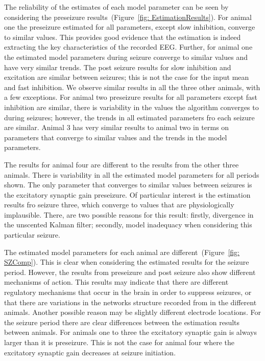 The reliability of the estimates of each model parameter can be seen by considering the preseizure results~(Figure~\ref{fig: EstimationResults}). For animal one the preseizure estimated for all parameters, except slow inhibition, converge to similar values. This provides good evidence that the estimation is indeed extracting the key characteristics of the recorded EEG. Further, for animal one the estimated model parameters during seizure converge to similar values and have very similar trends. The post seizure results for slow inhibition and excitation are similar between seizures; this is not the case for the input mean and fast inhibition. We observe similar results in all the three other animals, with a few exceptions. For animal two preseizure results for all parameters except fast inhibition are similar, there is variability in the values the algorithm converges to during seizures; however, the trends in all estimated parameters fro each seizure are similar. Animal 3 has very similar results to animal two in terms on parameters that converge to similar values and the trends in the model parameters. 

The results for animal four are different to the results from the other three animals. There is variability in all the estimated model parameters for all periods shown. The only parameter that converges to similar values between seizures is the excitatory synaptic gain preseizure. Of particular interest is the estimation results fro seizure three, which converge to values that are physiologically implausible. There, are two possible reasons for this result: firstly, divergence in the unscented Kalman filter; secondly, model inadequacy when considering this particular seizure. 

The estimated model parameters for each animal are different~(Figure~\ref{fig: SZComp}). This is clear when considering the estimated results for the seizure period. However, the results from preseizure and post seizure also show different mechanisms of action. This results may indicate that there are different regulatory mechanisms that occur in the brain in order to suppress seizures, or that there are variations in the networks structure recorded from in the different animals. Another possible reason may be slightly different electrode locations. For the seizure period there are clear differences between the estimation results between animals. For animals one to three the excitatory synaptic gain is always larger than it is preseizure. This is not the case for animal four where the excitatory synaptic gain decreases at seizure initiation. 
















